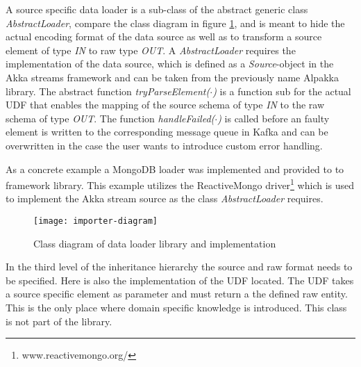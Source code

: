 A source specific data loader is a sub-class of the abstract generic class \textit{AbstractLoader}, compare the class diagram in figure \ref{fig:importer-diagram}, and is meant to hide the actual encoding format of the data source as well as to transform a source element of type \textit{IN} to raw type \textit{OUT}. A \textit{AbstractLoader} requires the implementation of the data source, which is defined as a \textit{Source}-object in the Akka streams framework and can be taken from the previously name Alpakka library. The abstract function \textit{tryParseElement($\cdot$)} is a function sub for the actual UDF that enables the mapping of the source schema of type \textit{IN} to the raw schema of type \textit{OUT}. The function \textit{handleFailed($\cdot$)} is called before an faulty element is written to the corresponding message queue in Kafka and can be overwritten in the case the user wants to introduce custom error handling.

As a concrete example a MongoDB loader was implemented and provided to to framework library. This example utilizes the ReactiveMongo driver\footnote{www.reactivemongo.org/} which is used to implement the Akka stream source as the class \textit{AbstractLoader} requires.

\begin{figure}[htb]
  \centering
  \texttt{[image: importer-diagram]}\\
  \caption{Class diagram of data loader library and implementation}
  \label{fig:importer-diagram}
\end{figure}

In the third level of the inheritance hierarchy the source and raw format needs to be specified. Here is also the implementation of the UDF located. The UDF takes a source specific element as parameter and must return a the defined raw entity. This is the only place where domain specific knowledge is introduced. This class is not part of the library.

